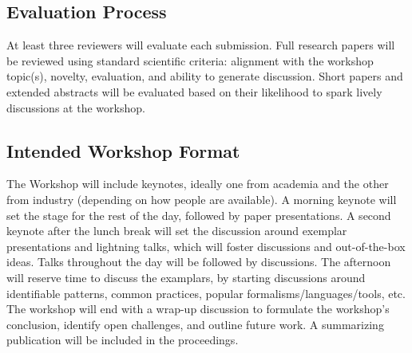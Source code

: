 
\subsection{Evaluation Process}
At least three reviewers will evaluate each submission.
Full research papers will be reviewed using standard scientific criteria: alignment 
with the workshop topic(s), novelty, evaluation, and ability to generate discussion.
Short papers and extended abstracts will be evaluated based on their likelihood 
to spark lively discussions at the workshop.

\subsection{Intended Workshop Format}
The Workshop will include keynotes, ideally one from academia and the other from industry
(depending on how people are available). A morning keynote will set the stage for the
rest of the day, followed by paper presentations. A second keynote after the lunch break
will set the discussion around exemplar presentations and lightning talks, which will
foster discussions and out-of-the-box ideas.
Talks throughout the day will be followed by discussions. The afternoon will reserve
time to discuss the examplars, by starting discussions around identifiable patterns,
common practices, popular formalisms/languages/tools, etc. 
The workshop will end with a wrap-up discussion to formulate the workshop's 
conclusion, identify open challenges, and outline future work.
A summarizing publication will be included in the proceedings.

